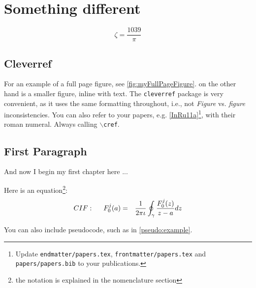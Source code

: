 
\chapter{Something different }

 \lipsum[1]
\begin{equation}
    \zeta = \frac{1039}{\pi}
\end{equation}

\section{Cleverref}
For an example of a full page figure, see \cref{fig:myFullPageFigure}. 
 on the other hand is a smaller figure, inline with text. 
The \texttt{cleverref} package is very convenient, as it uses the same 
formatting throughout, i.e., not \emph{Figure} vs. \emph{figure} 
inconsistencies. You can also refer to your papers, e.g. 
\cref{InRu11a}\footnote{Update \texttt{endmatter/papers.tex},
    \texttt{frontmatter/papers.tex} and \texttt{papers/papers.bib} to your 
    publications.},  
with their roman numeral. Always calling \texttt{$\backslash$cref}.

\lipsum[3]

\section{First Paragraph}
And now I begin my first chapter here ...

Here is an equation\footnote{the notation is explained in the nomenclature 
section}:
\begin{eqnarray}
	CIF: \hspace*{5mm}F_0^j(a) &=& \frac{1}{2\pi \iota} \oint_{\gamma} \frac{F_0^j(z)}{z - a} dz
\end{eqnarray}

\lipsum[4-6]

You can also include pseudocode, such as in \cref{pseudo:example}.
\lipsum[4-6]



